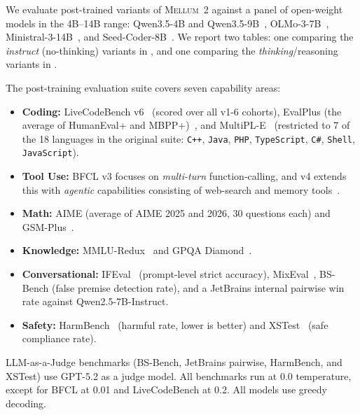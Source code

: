 \documentclass[11pt,a4paper]{article}
\newcommand{\modelname}{\textsc{Mellum~2}\xspace}
\begin{document}
We evaluate post-trained variants of \modelname against a panel of open-weight
models in the 4B--14B range: Qwen3.5-4B and Qwen3.5-9B~\cite{yang2025qwen3},
OLMo-3-7B~\cite{olmo3}, Ministral-3-14B~\cite{liu2026ministral3}, and
Seed-Coder-8B~\cite{zhang2025seedcoder}. We report two tables: one comparing
the \emph{instruct} (no-thinking) variants in ,
and one comparing the \emph{thinking}/reasoning variants in
. 

The post-training evaluation suite covers seven capability areas:
\begin{itemize}
  \item \textbf{Coding:} 
    LiveCodeBench v6~\cite{jain2024livecodebench} (scored over all v1-6 cohorts), 
    EvalPlus (the average of HumanEval+ and MBPP+)~\cite{liu2023evalplus}, and
    MultiPL-E~\cite{cassano2022multipl} (restricted to 7 of the 18 languages
in the original suite: \texttt{C++}, \texttt{Java}, \texttt{PHP},
\texttt{TypeScript}, \texttt{C\#}, \texttt{Shell}, \texttt{JavaScript}).
  \item \textbf{Tool Use:} BFCL v3 focuses on \textit{multi-turn} function-calling, and v4 extends this with \textit{agentic} capabilities consisting of web-search and memory tools~\cite{patil2025bfcl}.
  \item \textbf{Math:} AIME (average of AIME 2025 and 2026, 30
    questions each) and GSM-Plus~\cite{li2024gsmplus}.
  \item \textbf{Knowledge:} MMLU-Redux~\cite{gema2024mmluredux} and
    GPQA Diamond~\cite{rein2023gpqa}.
  \item \textbf{Conversational:} 
    IFEval~\cite{zhou2023ifeval} (prompt-level strict accuracy),
    MixEval~\cite{ni2024mixeval}, BS-Bench (false premise detection rate), 
    and a JetBrains internal pairwise win rate against Qwen2.5-7B-Instruct.
  \item \textbf{Safety:} HarmBench~\cite{mazeika2024harmbench} (harmful rate, lower is
    better) and XSTest~\cite{rottger2024xstest} (safe compliance rate).
\end{itemize}

LLM-as-a-Judge benchmarks (BS-Bench, JetBrains pairwise, HarmBench, and XSTest) use GPT-5.2 as a judge model. 
All benchmarks run at 0.0 temperature, except for BFCL at 0.01 and LiveCodeBench at 0.2.
All models use greedy decoding.
\end{document}
